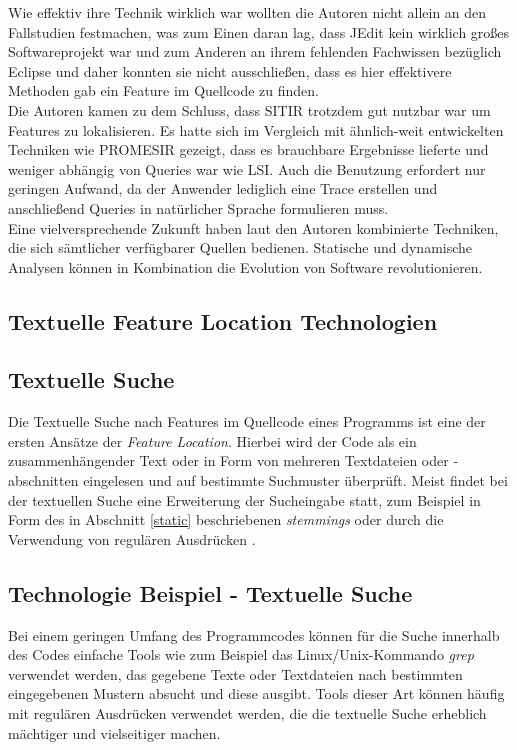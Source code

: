 \documentclass[runningheads,a4paper]{llncs}
\begin{document}
Wie effektiv ihre Technik wirklich war wollten die Autoren nicht allein an den Fallstudien festmachen, was zum Einen daran lag, dass JEdit kein wirklich großes Softwareprojekt war und zum Anderen an ihrem fehlenden Fachwissen bezüglich Eclipse und daher konnten sie nicht ausschließen, dass es hier effektivere Methoden gab ein Feature im Quellcode zu finden.\\
Die Autoren kamen zu dem Schluss, dass SITIR trotzdem gut nutzbar war um Features zu lokalisieren. Es hatte sich im Vergleich mit ähnlich-weit entwickelten Techniken wie PROMESIR gezeigt, dass es brauchbare Ergebnisse lieferte und weniger abhängig von Queries war wie LSI. Auch die Benutzung erfordert nur geringen Aufwand, da der Anwender lediglich eine Trace erstellen und anschließend Queries in natürlicher Sprache formulieren muss.\\
Eine vielversprechende Zukunft haben laut den Autoren kombinierte Techniken, die sich sämtlicher verfügbarer Quellen bedienen. Statische und dynamische Analysen können in Kombination die Evolution von Software revolutionieren. 

\subsection{Textuelle Feature Location Technologien}

\subsection*{Textuelle Suche}

Die Textuelle Suche nach Features im Quellcode eines Programms ist eine der ersten Ansätze der \textit{Feature Location}. Hierbei wird der Code als ein zusammenhängender Text oder in Form von mehreren Textdateien oder -abschnitten eingelesen und auf bestimmte Suchmuster überprüft. Meist findet bei der textuellen Suche eine Erweiterung der Sucheingabe statt, zum Beispiel in Form des in Abschnitt \ref{static} beschriebenen \textit{stemmings} oder durch die Verwendung von regulären Ausdrücken \cite{grep}.

\subsection*{Technologie Beispiel - Textuelle Suche}

Bei einem geringen Umfang des Programmcodes können für die Suche innerhalb des Codes einfache Tools wie zum Beispiel das Linux/Unix-Kommando \textit{grep} verwendet werden, das gegebene Texte oder Textdateien nach bestimmten eingegebenen Mustern absucht und diese ausgibt. Tools dieser Art können häufig mit regulären Ausdrücken verwendet werden, die die textuelle Suche erheblich mächtiger und vielseitiger machen.
\end{document}

